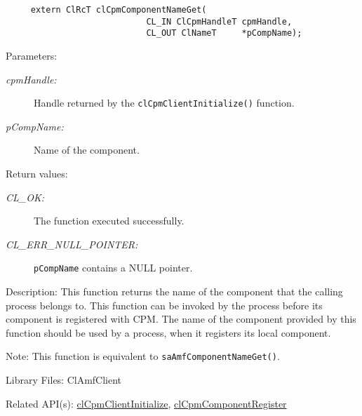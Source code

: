 {\begin{Desc}
\footnotesize\begin{verbatim}     extern ClRcT clCpmComponentNameGet(
                			CL_IN ClCpmHandleT cpmHandle,
                			CL_OUT ClNameT     *pCompName);
\end{verbatim}
\normalsize
\end{Desc}
\begin{Desc}
\item[Parameters:]
\begin{description}
\item[{\em cpm\-Handle:}]Handle returned by the {\tt{cl\-Cpm\-Client\-Initialize()}} function.
\item[{\em p\-Comp\-Name:}]Name of the component.
\end{description}
\end{Desc}
\begin{Desc}
\item[Return values:]
\begin{description}
\item[{\em CL\_\-OK:}]The function executed successfully. \item[{\em CL\_\-ERR\_\-NULL\_\-POINTER:}]{\tt{pCompName}} contains a NULL pointer.\end{description}
\end{Desc}
\begin{Desc}
\item[Description:]This function returns the name of the component that the calling process belongs to. This function can be invoked by the process
before its component is registered with CPM. The name of the component provided by this function should be used by a process, when it registers its local 
component.\end{Desc}
\begin{Desc}
\item[Note:]This function is equivalent to {\tt{sa\-Amf\-Component\-Name\-Get()}}.\end{Desc}
\begin{Desc}
\item[Library Files:]Cl\-Amf\-Client\end{Desc}

\begin{Desc}
\item[Related API(s):]\hyperlink{group__group14}{cl\-Cpm\-Client\-Initialize}, \hyperlink{group__group14}{cl\-Cpm\-Component\-Register} \end{Desc}
\newpage






}
